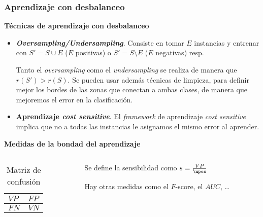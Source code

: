 \begin{frame}\frametitle{Aprendizaje con desbalanceo}
\par\textbf{Técnicas de aprendizaje con desbalanceo}
\begin{itemize}
 \item \textbf{\textit{Oversampling/Undersampling}}. Consiste en tomar $E$ instancias y entrenar con 
 $S' = S\cup E$ ($E$ positivas) o $S' = S\setminus E$ ($E$ negativas) resp.
 
 Tanto el \textit{oversampling} como el \textit{undersampling} se realiza de manera que $r(S') > r(S)$. Se pueden usar además
 técnicas de limpieza, para definir mejor los bordes de las zonas que conectan a ambas clases, de manera que mejoremos el error
 en la clasificación.
 
 \item \textbf{Aprendizaje \textit{cost sensitive}}. El \textit{framework} de aprendizaje \textit{cost sensitive} implica que no
 a todas las instancias le asignamos el mismo error al aprender.
\end{itemize}
\medskip

\par\textbf{Medidas de la bondad del aprendizaje}
\begin{columns}
 \begin{column}{0.5\textwidth}
  \begin{table}[H]
    \centering
    \begin{tabular}{C{2cm}|C{2cm}}
    $VP$ & $FP$\\
    \hline
    $FN$ & $VN$\\
    \end{tabular}
    \caption{Matriz de confusión}
  \end{table}
 \end{column}
 
 \begin{column}{0.5\textwidth}
  \begin{definition}[Sensibilidad]
   Se define la sensibilidad como $s = \frac{VP}{\npos}$ 
  \end{definition}
  
  Hay otras medidas como el $F$-score, el $AUC$, \ldots
 \end{column}
\end{columns}
\end{frame}

